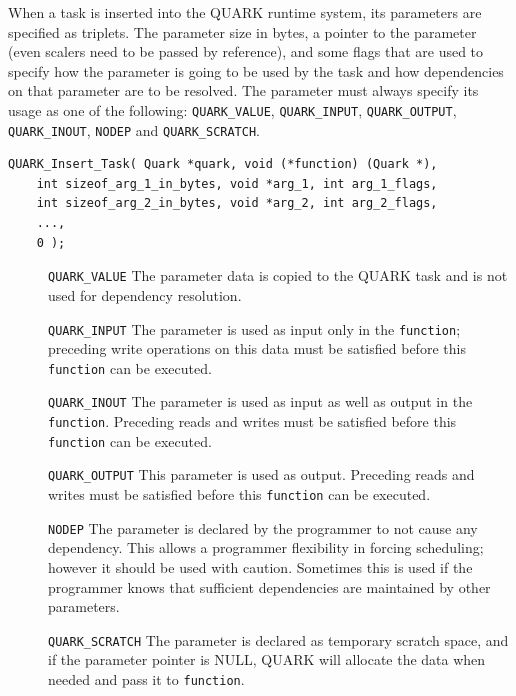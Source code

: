 \documentclass[11pt,letterpaper]{report}
\begin{document}
When a task is inserted into the QUARK runtime system, its parameters
are specified as triplets.  The parameter size in bytes, a pointer to
the parameter (even scalers need to be passed by reference), and some
flags that are used to specify how the parameter is going to be used by
the task and how dependencies on that parameter are to be resolved.
The parameter must always specify its usage as one of the following:
\verb|QUARK_VALUE|, \verb|QUARK_INPUT|, \verb|QUARK_OUTPUT|, \verb|QUARK_INOUT|, \verb|NODEP|
and \verb|QUARK_SCRATCH|.
\begin{samepage}
\begin{lstlisting}
QUARK_Insert_Task( Quark *quark, void (*function) (Quark *),
    int sizeof_arg_1_in_bytes, void *arg_1, int arg_1_flags,
    int sizeof_arg_2_in_bytes, void *arg_2, int arg_2_flags,
    ...,
    0 );
\end{lstlisting}
\end{samepage}
\begin{description}
\item[]\verb|QUARK_VALUE| The parameter data is copied to the QUARK task and
  is not used for dependency resolution.
\item[]\verb|QUARK_INPUT| The parameter is used as input only in the
  \verb|function|; preceding write operations on this data must be
  satisfied before this \verb|function| can be executed.
\item[]\verb|QUARK_INOUT| The parameter is used as input as well as output
  in the \verb|function|.  Preceding reads and writes must be
  satisfied before this \verb|function| can be executed.
\item[]\verb|QUARK_OUTPUT| This parameter is used as output.  Preceding
  reads and writes must be satisfied before this \verb|function| can
  be executed.
\item[]\verb|NODEP| The parameter is declared by the programmer to not
  cause any dependency.  This allows a programmer flexibility in
  forcing scheduling; however it should be used with caution.
  Sometimes this is used if the programmer knows that sufficient
  dependencies are maintained by other parameters.
\item[]\verb|QUARK_SCRATCH| The parameter is declared as temporary scratch
  space, and if the parameter pointer is NULL, QUARK will allocate the
  data when needed and pass it to \verb|function|.
\end{description}
\end{document}
